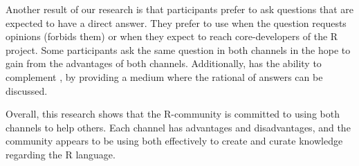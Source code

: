 Another result of our research is that participants prefer \SO to ask questions that are expected to have a direct answer. They prefer to use \RH when the
question requests opinions (\SO forbids them) or when they expect to reach core-developers of the R project. Some participants ask the same question in both
channels in the hope to gain from the advantages of both channels. Additionally, \RH has the ability to complement \SO, by providing a medium where the rational
of answers can be discussed.

Overall, this research shows that the R-community is committed to using both channels to help others. Each channel has advantages and disadvantages, and the
community appears to be using both effectively to create and curate knowledge regarding the R language.









